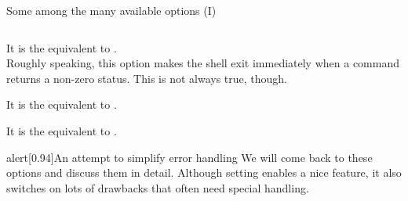 \begin{frame}{Some among the many available options (I)}
\begin{columns}
\begin{column}{\dimexpr\paperwidth-10mm}
\begin{onlyenv}
\begin{description}
                        It is the equivalent to .\\
                        Roughly speaking, this option makes the shell exit immediately when a command returns a non-zero status.
                        This is not always true, though.
                    \item[\PB{\texttt{-o errtrace}}]
                        It is the equivalent to .
                    \item[\PB{\texttt{-o functrace}}]
                        It is the equivalent to .
                \end{description}
                \begin{varblock}{alert}[0.94\textwidth]{An attempt to simplify error handling}
                    We will come back to these options and discuss them in detail.
                    Although setting  enables a nice feature, it also switches on lots of drawbacks that often need special handling.
                \end{varblock}
                \begin{center}
                \end{center}
            \end{onlyenv}
        \end{column}
    \end{columns}
\end{frame}
